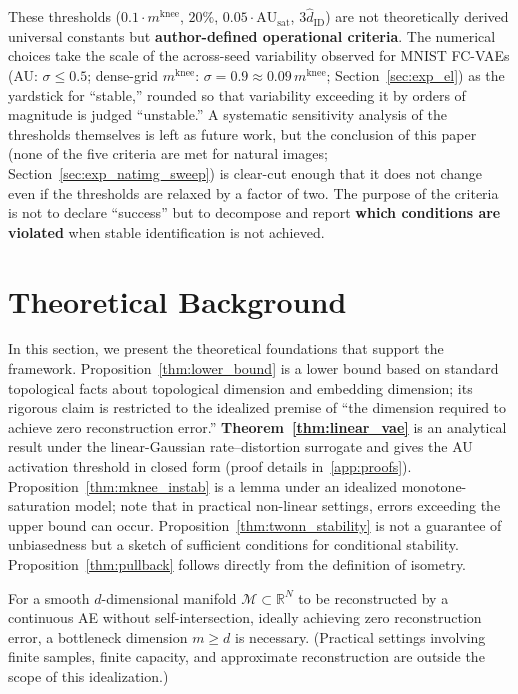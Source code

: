 \documentclass[make,article,submit,pdftex,moreauthors]{Definitions/mdpi}
\newcommand{\R}{\mathbb{R}}
\newcommand{\AUsat}{\mathrm{AU}_{\mathrm{sat}}}
\newcommand{\mknee}{m^{\mathrm{knee}}}
\begin{document}
These thresholds ($0.1\cdot\mknee$, $20\%$, $0.05\cdot\AUsat$,
$3\hat{d}_\mathrm{ID}$) are not theoretically derived universal constants but
\textbf{author-defined operational criteria}.
The numerical choices take the scale of the across-seed variability observed for
MNIST FC-VAEs (AU: $\sigma \leq 0.5$; dense-grid $\mknee$:
$\sigma = 0.9 \approx 0.09\,\mknee$; Section~\ref{sec:exp_el}) as the yardstick
for ``stable,'' rounded so that variability exceeding it by orders of magnitude is
judged ``unstable.''
A systematic sensitivity analysis of the thresholds themselves is left as future
work, but the conclusion of this paper (none of the five criteria are met for
natural images; Section~\ref{sec:exp_natimg_sweep}) is clear-cut enough that it
does not change even if the thresholds are relaxed by a factor of two.
The purpose of the criteria is not to declare ``success'' but to decompose and
report \textbf{which conditions are violated} when stable identification is not
achieved.

\section{Theoretical Background}\label{sec:theory}

In this section, we present the theoretical foundations that support the framework.
Proposition~\ref{thm:lower_bound} is a lower bound based on standard topological facts
about topological dimension and embedding dimension; its rigorous claim is restricted to
the idealized premise of ``the dimension required to achieve zero reconstruction error.''
\textbf{Theorem~\ref{thm:linear_vae}} is an analytical result under the linear-Gaussian
rate--distortion surrogate and gives the AU activation threshold in closed form
(proof details in~\ref{app:proofs}).
Proposition~\ref{thm:mknee_instab} is a lemma under an idealized monotone-saturation model;
note that in practical non-linear settings, errors exceeding the upper bound can occur.
Proposition~\ref{thm:twonn_stability} is not a guarantee of unbiasedness but a sketch of
sufficient conditions for conditional stability.
Proposition~\ref{thm:pullback} follows directly from the definition of isometry.

\begin{Proposition}\label{thm:lower_bound}
For a smooth $d$-dimensional manifold $\mathcal{M} \subset \R^N$ to be reconstructed by
a continuous AE without self-intersection, ideally achieving zero reconstruction error,
a bottleneck dimension $m \geq d$ is necessary.
(Practical settings involving finite samples, finite capacity, and approximate
reconstruction are outside the scope of this idealization.)
\end{Proposition}
\end{document}
